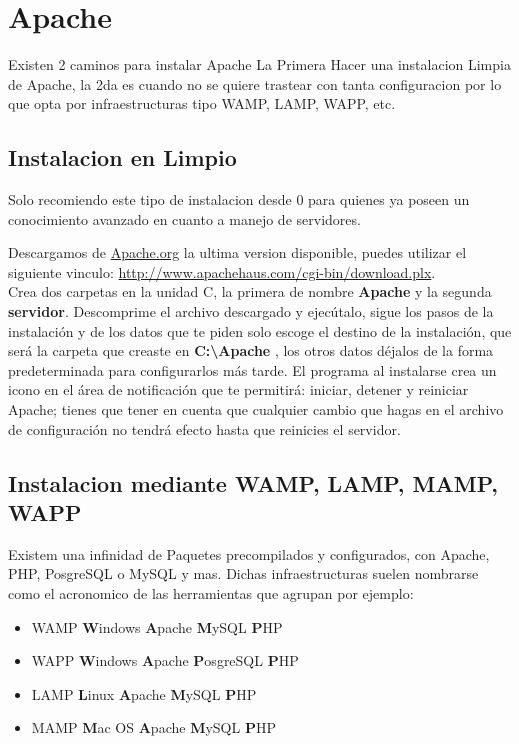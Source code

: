 \section{Apache}

Existen 2 caminos para instalar Apache La Primera Hacer una instalacion Limpia
de Apache, la 2da es cuando no se quiere trastear con tanta configuracion por lo que
opta por infraestructuras tipo WAMP, LAMP, WAPP, etc.

\subsection{Instalacion en Limpio}

Solo recomiendo este tipo de instalacion desde 0 para quienes ya poseen un conocimiento
avanzado en cuanto a manejo de servidores.

Descargamos de \url{Apache.org} la ultima version disponible, puedes utilizar el siguiente
vinculo: \url{http://www.apachehaus.com/cgi-bin/download.plx}. \\ 
Crea dos carpetas en la unidad C, la primera de nombre {\bfseries Apache} y la segunda
{\bfseries servidor}. Descomprime el archivo descargado y ejecútalo,
sigue los pasos de la instalación y de los datos que te piden solo escoge el
destino de la instalación, que será la carpeta que creaste en
{\bfseries C:\textbackslash Apache }, los otros datos déjalos de la forma
predeterminada para configurarlos más tarde.
El programa al instalarse crea un icono en el área de notificación que te
permitirá: iniciar, detener y reiniciar Apache; tienes que tener en cuenta que
cualquier cambio que hagas en el archivo de configuración no tendrá efecto
hasta que reinicies el servidor.

\subsection{Instalacion mediante WAMP, LAMP, MAMP, WAPP}

Existem una infinidad de Paquetes precompilados y configurados, con Apache, PHP, PosgreSQL o MySQL y mas.
Dichas infraestructuras suelen nombrarse como el acronomico de las herramientas que agrupan por ejemplo:\\[1cm]

\begin{itemize}
    \item {\large WAMP {\bfseries W}indows {\bfseries A}pache {\bfseries M}ySQL {\bfseries P}HP}
    \item {\large WAPP  {\bfseries W}indows {\bfseries A}pache {\bfseries P}osgreSQL {\bfseries P}HP}  
    \item {\large LAMP {\bfseries L}inux {\bfseries A}pache {\bfseries M}ySQL {\bfseries P}HP} 
    \item {\large MAMP {\bfseries M}ac OS {\bfseries A}pache {\bfseries M}ySQL {\bfseries P}HP}  
\end{itemize}


